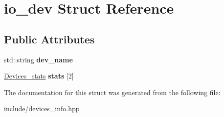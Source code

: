 \hypertarget{structio__dev}{}\section{io\+\_\+dev Struct Reference}
\label{structio__dev}
\subsection*{Public Attributes}
\begin{DoxyCompactItemize}
\item 
\mbox{\label{structio__dev_a2addaf9be2046af4a6f9e3d910f16ef4}} 
std\+::string {\bfseries dev\+\_\+name}
\item 
\mbox{\label{structio__dev_aad3294d6446ffc1a6ba680214a009bbd}} 
\mbox{\hyperlink{structdevices__stats}{Devices\+\_\+stats}} {\bfseries stats} \mbox{[}2\mbox{]}
\end{DoxyCompactItemize}


The documentation for this struct was generated from the following file\+:\begin{DoxyCompactItemize}
\item 
include/devices\+\_\+info.\+hpp\end{DoxyCompactItemize}
